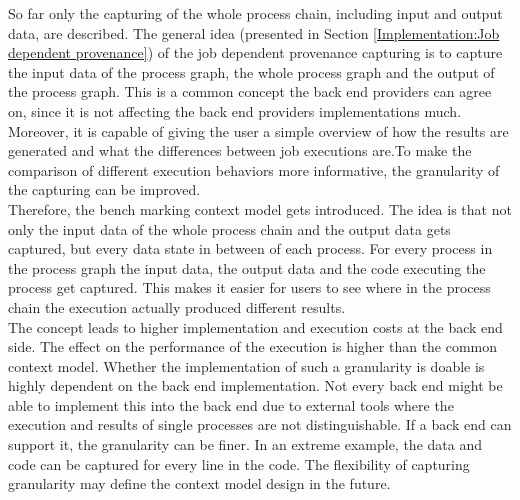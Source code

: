 \documentclass[draft,final]{vutinfth} %
\begin{document}
So far only the capturing of the whole process chain, including input and output data, are described. The general idea (presented in Section \ref{Implementation:Job dependent provenance}) of the job dependent provenance capturing is to capture the input data of the process graph, the whole process graph and the output of the process graph. This is a common concept the back end providers can agree on, since it is not affecting the back end providers implementations much. Moreover, it is capable of giving the user a simple overview of how the results are generated and what the differences between job executions are.To make the comparison of different execution behaviors more informative, the granularity of the capturing can be improved. \\
Therefore, the bench marking context model gets introduced. The idea is that not only the input data of the whole process chain and the output data gets captured, but every data state in between of each process. For every process in the process graph the input data, the output data and the code executing the process get captured. This makes it easier for users to see where in the process chain the execution actually produced different results.\\ The concept leads to higher implementation and execution costs at the back end side. The effect on the performance of the execution is higher than the common context model. Whether the implementation of such a granularity is  doable is highly dependent on the back end implementation. Not every back end might be able to implement this into the back end due to external tools where the execution and results of single processes are not distinguishable. If a back end can support it, the granularity can be finer. In an extreme example, the data and code can be captured for every line in the code. The flexibility of capturing granularity may define the context model design in the future.  


\backmatter

\listoffigures %

\cleardoublepage %
\listoftables %


\printindex

\printglossaries



\end{document}
